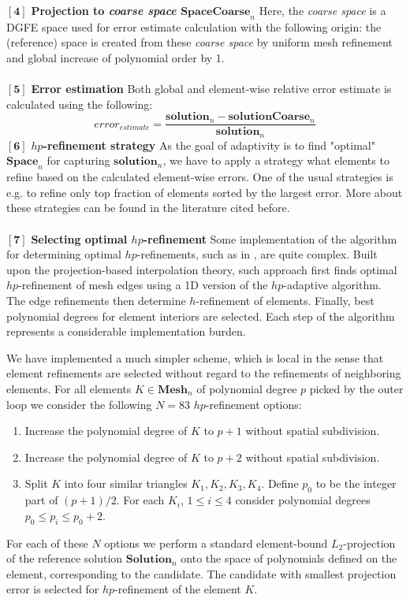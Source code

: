 $\mathbf{[4]}$ \textbf{Projection to \emph{coarse space} $\mathbf{SpaceCoarse}_n$} Here, the \emph{coarse space} is a DGFE space used for error estimate calculation with the following origin: the (reference) space is created from these \emph{coarse space} by uniform mesh refinement and global increase of polynomial order by 1.\\\ \\
$\mathbf{[5]}$ \textbf{Error estimation} Both global and element-wise relative error estimate is calculated using the following:
	$$error_{estimate} = \frac{\mathbf{solution}_{n} - \mathbf{solutionCoarse}_n}{\mathbf{solution}_{n}}$$
$\mathbf{[6]}$  \textbf{$hp$-refinement strategy} As the goal of adaptivity is to find "optimal" $\mathbf{Space}_n$ for capturing ${\mathbf{solution}_{n}}$, we have to apply a strategy what elements to refine based on the calculated element-wise errors. One of the usual strategies is e.g. to refine only top fraction of elements sorted by the largest error. More about these strategies can be found in the literature cited before.\\\ \\
$\mathbf{[7]}$  \textbf{Selecting optimal $hp$-refinement}
Some implementation of the algorithm for determining optimal $hp$-refinements, such as in \cite{derade}, are 
quite complex. Built upon the projection-based interpolation theory,
such approach first finds optimal $hp$-refinement of mesh edges using a 1D
version of the $hp$-adaptive algorithm. The edge refinements then
determine $h$-refinement of elements. Finally, best polynomial
degrees for element interiors are selected. Each step of the algorithm
represents a considerable implementation burden.

We have implemented a much simpler scheme, which is local in the sense
that element refinements are selected without regard to the refinements
of neighboring elements. For all elements $K\in \mathbf{Mesh}_n$ of polynomial
degree $p$ picked by the outer loop we consider the following 
$N = 83$ $hp$-refinement options:
\begin{enumerate}
\item Increase the polynomial degree of $K$ to $p+1$ without spatial subdivision.
\item Increase the polynomial degree of $K$ to $p+2$ without spatial subdivision.
\item Split $K$ into four similar triangles $K_1, K_2, K_3, K_4$.
      Define $p_0$ to be the integer part of $(p+1)/2$.
      For each $K_i$, $1 \le i \le 4$ consider polynomial
      degrees $p_0 \le p_i \le p_0 + 2$.
\end{enumerate}
For each of these $N$ options we perform a standard element-bound $L_2$-projection
of the reference solution $\mathbf{Solution}_{n}$ onto the space of polynomials defined on the element, corresponding to the candidate. The candidate with smallest projection error is selected
for $hp$-refinement of the element $K$.\\

